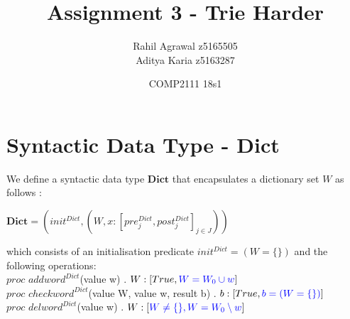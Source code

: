 \documentclass[a4paper,12pt,fleqn]{scrartcl}
\title{Assignment 3 - Trie Harder}
\date{COMP2111 18s1}
\author{Rahil Agrawal z5165505\\Aditya Karia z5163287}
\newcommand{\Dict}{\mathbf{Dict}}
\begin{document}
\maketitle
{}

\section{Syntactic Data Type - Dict}
\label{sec:task-1}
We define a syntactic data type $\Dict$ that encapsulates a dictionary set $W$ as follows :
\begin{center}$\Dict = (init^{Dict} , (W,x : [pre_{j}^{Dict}, post_{j}^{Dict}]_{j\in J}))$\end{center}
which consists of an  initialisation predicate \color{blue}$init^{Dict} = (W = \{ \})$ \color{black} and the following operations:\\
$proc$ $addword^{Dict}$(value w) . $W : [True, \color{blue}W = W_{0} \cup w\color{black}]$\\
$proc$ $checkword^{Dict}$(value W, value w, result b) . $b : [True, \color{blue}b = (W = \{ \})\color{black}]$\\
$proc$ $delword^{Dict}$(value w) . $W : [\color{blue}W\neq \{ \}, W = W_{0} \setminus {w}\color{black}]$\\
\end{document}
